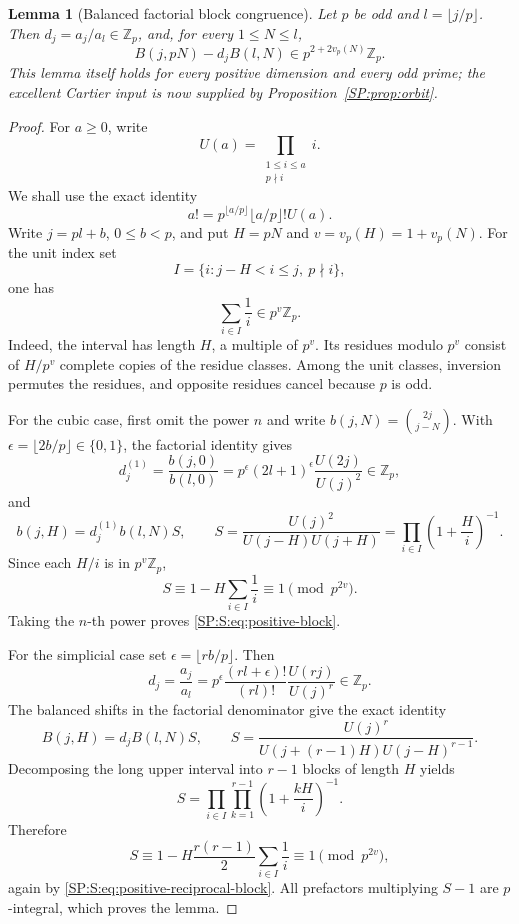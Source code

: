 \documentclass[11pt,a4paper]{article}
\newtheorem{lemma}[theorem]{Lemma}
\theoremstyle{definition}\newtheorem{definition}[theorem]{Definition}
\theoremstyle{remark}\newtheorem{remark}[theorem]{Remark}
\numberwithin{equation}{section}
\begin{document}
\begin{lemma}[Balanced factorial block congruence]
\label{SP:S:lem:positive-block}
Let \(p\) be odd and \(l=\lfloor j/p\rfloor\).
Then \(d_j=a_j/a_l\in\mathbb Z_p\), and, for every
\(1\leq N\leq l\),
\begin{equation}\label{SP:S:eq:positive-block}
 B(j,pN)-d_j B(l,N)
 \in p^{2+2v_p(N)}\mathbb Z_p.
\end{equation}
This lemma itself holds for every positive dimension and every
odd prime; the excellent Cartier input is now supplied by Proposition~\ref{SP:prop:orbit}.
\end{lemma}

\begin{proof}
For \(a\geq0\), write
\[
 U(a)=\prod_{\substack{1\leq i\leq a\\p\nmid i}}i.
\]
We shall use the exact identity
\[
 a!=p^{\lfloor a/p\rfloor}\lfloor a/p\rfloor!U(a).
\]
Write \(j=pl+b\), \(0\leq b<p\), and put \(H=pN\) and
\(v=v_p(H)=1+v_p(N)\).
For the unit index set
\[
 I=\{i:j-H<i\leq j,\ p\nmid i\},
\]
one has
\begin{equation}\label{SP:S:eq:positive-reciprocal-block}
 \sum_{i\in I}\frac1i\in p^v\mathbb Z_p.
\end{equation}
Indeed, the interval has length \(H\), a multiple of \(p^v\).
Its residues modulo \(p^v\) consist of \(H/p^v\) complete
copies of the residue classes.  Among the unit classes, inversion
permutes the residues, and opposite residues cancel because
\(p\) is odd.

For the cubic case, first omit the power \(n\) and write
\(b(j,N)=\binom{2j}{j-N}\).
With \(\epsilon=\lfloor2b/p\rfloor\in\{0,1\}\), the
factorial identity gives
\[
 d_j^{(1)}=\frac{b(j,0)}{b(l,0)}
 =p^\epsilon(2l+1)^\epsilon\frac{U(2j)}{U(j)^2}
 \in\mathbb Z_p,
\]
and
\[
 b(j,H)=d_j^{(1)}b(l,N)S,\qquad
 S=\frac{U(j)^2}{U(j-H)U(j+H)}
   =\prod_{i\in I}\left(1+\frac H i\right)^{-1}.
\]
Since each \(H/i\) is in \(p^v\mathbb Z_p\),
\[
 S\equiv1-H\sum_{i\in I}\frac1i\equiv1\pmod{p^{2v}}.
\]
Taking the \(n\)-th power proves \eqref{SP:S:eq:positive-block}.

For the simplicial case set \(\epsilon=\lfloor rb/p\rfloor\).
Then
\[
 d_j=\frac{a_j}{a_l}
 =p^\epsilon\frac{(rl+\epsilon)!}{(rl)!}
             \frac{U(rj)}{U(j)^r}\in\mathbb Z_p.
\]
The balanced shifts in the factorial denominator give the exact
identity
\[
 B(j,H)=d_jB(l,N)S,\qquad
 S=\frac{U(j)^r}
 {U(j+(r-1)H)U(j-H)^{r-1}}.
\]
Decomposing the long upper interval into \(r-1\) blocks of
length \(H\) yields
\[
 S=\prod_{i\in I}\prod_{k=1}^{r-1}
          \left(1+\frac{kH}{i}\right)^{-1}.
\]
Therefore
\[
 S\equiv
 1-H\frac{r(r-1)}2\sum_{i\in I}\frac1i
 \equiv1\pmod{p^{2v}},
\]
again by \eqref{SP:S:eq:positive-reciprocal-block}.
All prefactors multiplying \(S-1\) are \(p\)-integral,
which proves the lemma.
\end{proof}
\end{document}
